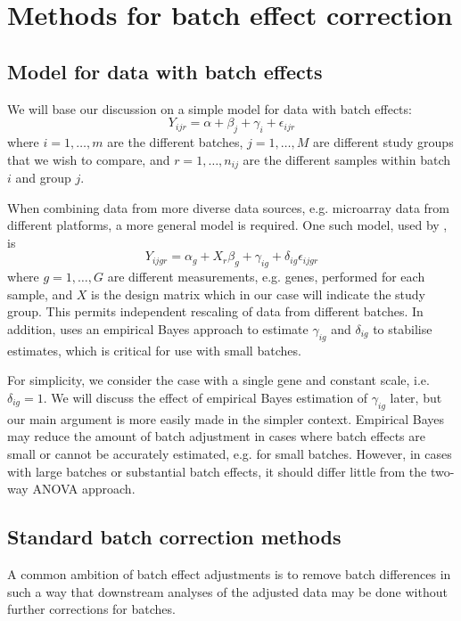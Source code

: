 \documentclass{bio}
\begin{document}
\section{Methods for batch effect correction}

\subsection{Model for data with batch effects}

We will base our discussion on a simple model for data with batch effects:
\begin{equation}
Y_{ijr}=\alpha+\beta_j+\gamma_i+\epsilon_{ijr}
\end{equation}
where $i=1,\ldots,m$ are the different batches, $j=1,\ldots,M$ are different study groups that we wish to compare, and $r=1,\ldots,n_{ij}$ are the different samples within batch $i$ and group $j$.

When combining data from more diverse data sources, e.g. microarray data from different platforms, a more general model is required. One such model, used by \citet{Johnson2007}, is
\begin{equation}
Y_{ijgr}=\alpha_g+X_r\beta_{g}+\gamma_{ig}+\delta_{ig}\epsilon_{ijgr}
\end{equation}
where $g=1,\ldots,G$ are different measurements, e.g. genes, performed for each sample, and $X$ is the design matrix which in our case will indicate the study group. This permits independent rescaling of data from different batches. In addition, \citet{Johnson2007} uses an empirical Bayes approach to estimate $\gamma_{ig}$ and $\delta_{ig}$ to stabilise estimates, which is critical for use with small batches.

For simplicity, we consider the case with a single gene and constant scale, i.e. $\delta_{ig}=1$. We will discuss the effect of empirical Bayes estimation of $\gamma_{ig}$ later, but our main argument is more easily made in the simpler context. Empirical Bayes may reduce the amount of batch adjustment in cases where batch effects are small or cannot be accurately estimated, e.g. for small batches. However, in cases with large batches or substantial batch effects, it should differ little from the two-way ANOVA approach.

\subsection{Standard batch correction methods}

A common ambition of batch effect adjustments is to remove batch differences in such a way that downstream analyses of the adjusted data may be done without further corrections for batches.
\end{document}
